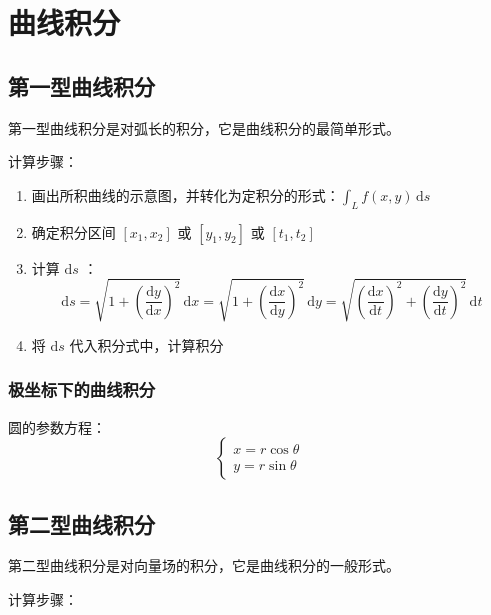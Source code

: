 \chapter{曲线积分}

\section{第一型曲线积分}

第一型曲线积分是对弧长的积分，它是曲线积分的最简单形式。

计算步骤：

\begin{enumerate}
    \item 画出所积曲线的示意图，并转化为定积分的形式：$\int_{L} f(x,y) \, \mathrm{d}s$
    \item 确定积分区间 $[x_1,x_2]$ 或 $[y_1,y_2]$ 或 $[t_1,t_2]$
    \item 计算 $\mathrm{d}s$ ：
          \[
              \mathrm{d}s = \sqrt{1+(\frac{\mathrm{d}y}{\mathrm{d}x})^2} \, \mathrm{d}x = \sqrt{1+(\frac{\mathrm{d}x}{\mathrm{d}y})^2} \, \mathrm{d}y = \sqrt{(\frac{\mathrm{d}x}{\mathrm{d}t})^2+(\frac{\mathrm{d}y}{\mathrm{d}t})^2} \, \mathrm{d}t
          \]
    \item 将 $\mathrm{d}s$ 代入积分式中，计算积分
\end{enumerate}

\subsection{极坐标下的曲线积分}

圆的参数方程：
\[
    \begin{cases}
        x = r \cos \theta \\
        y = r \sin \theta
    \end{cases}
\]

\section{第二型曲线积分}

第二型曲线积分是对向量场的积分，它是曲线积分的一般形式。

计算步骤：

